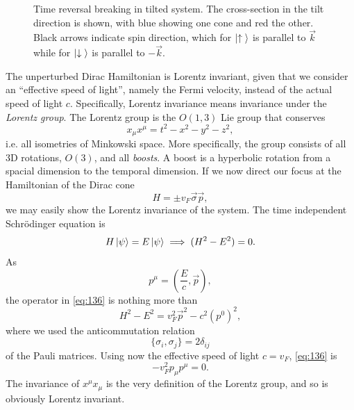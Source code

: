 \begin{figure}[h]
  \centering
  \caption{Time reversal breaking in tilted system.
    The cross-section in the tilt direction is shown, with blue showing one cone and red the other.
    Black arrows indicate spin direction, which for \(\ket{\uparrow {}}\) is parallel to  \(\vec{k}\) while for \(\ket{\downarrow {}}\) is parallel to \( -\vec{k} \).
    \label{fig:spin-struct-tilt}
  }
\end{figure}

The unperturbed Dirac Hamiltonian is Lorentz invariant, given that we consider an ``effective speed of light'', namely the Fermi velocity, instead of the actual speed of light \( c \).
Specifically, Lorentz invariance means invariance under the \emph{Lorentz group}.
The Lorentz group is the \( O(1,3) \) Lie group that conserves
\[
x_{\mu } x^{\mu } = t^2 - x^2 - y^2 - z^2,
\]
i.e. all isometries of Minkowski space.
More specifically, the group consists of all 3D rotations, \( O(3) \), and all \emph{boosts}.
A boost is a hyperbolic rotation from a spacial dimension to the temporal dimension.
If we now direct our focus at the Hamiltonian of the Dirac cone
\[
H = \pm v_{F} \vec{\sigma} \vec{p},
\]
we may easily show the Lorentz invariance of the system.
The time independent Schrödinger equation is
\begin{equation}
  \label{eq:136}
  H \ket{\psi } = E \ket{\psi } \implies (H^2 - E^2) = 0.
\end{equation}
As
\[
p^{\mu } = \left(\frac{E}{c}, \vec{p}\right),
\]
the operator in \cref{eq:136} is nothing more than
\begin{equation}
  \label{eq:137}
  H^2-E^2 = v_{F}^2 \vec{p}^2 - c^2 \left(p^0\right)^2 ,
\end{equation}
where we used the anticommutation relation
\[
\{\sigma_{i}, \sigma_{j}\} =  2 \delta _{ij}
\]
of the Pauli matrices.
Using now the effective speed of light \( c=v_F \), \cref{eq:136} is
\begin{equation}
  \label{eq:138}
  - v_F^2 p_{\mu } p^{\mu } = 0.
\end{equation}
The invariance of \( x^{\mu} x_{\mu} \) is the very definition of the Lorentz group, and so is obviously Lorentz invariant.


